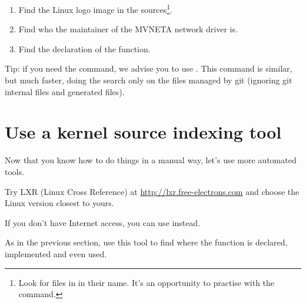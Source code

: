 \begin{enumerate}
\item Find the Linux logo image in the sources\footnote{Look for
      files in  in their name. It's an
      opportunity to practise with the  command.}.
\item Find who the maintainer of the MVNETA network driver is.
\item Find the declaration of the  function.
\end{enumerate}

Tip: if you need the  command, we advise you to use . This command is similar, but much faster, doing the search only
on the files managed by git (ignoring git internal files and generated
files).

\section{Use a kernel source indexing tool}

Now that you know how to do things in a manual way, let's use more
automated tools.

Try LXR (Linux Cross Reference) at \url{http://lxr.free-electrons.com}
and choose the Linux version closest to yours.

If you don't have Internet access, you can use  instead.

As in the previous section, use this tool to find where
the  function is declared, implemented and
even used.
